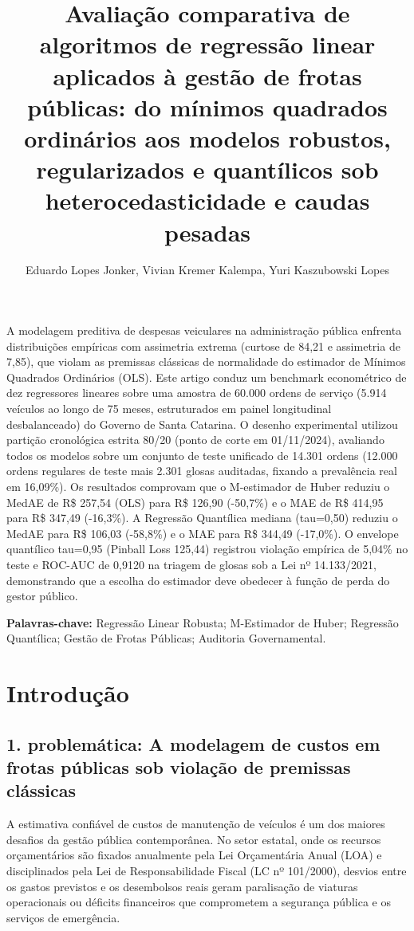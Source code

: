 \documentclass[12pt,a4paper]{article}
\title{\textbf{Avaliação comparativa de algoritmos de regressão linear aplicados à gestão de frotas públicas: do mínimos quadrados ordinários aos modelos robustos, regularizados e quantílicos sob heterocedasticidade e caudas pesadas}}
\author{Eduardo Lopes Jonker\inst{1}, Vivian Kremer Kalempa\inst{1}, Yuri Kaszubowski Lopes\inst{1}}
\begin{document}
\maketitle

\begin{resumo}
A modelagem preditiva de despesas veiculares na administração pública enfrenta distribuições empíricas com assimetria extrema (curtose de 84,21 e assimetria de 7,85), que violam as premissas clássicas de normalidade do estimador de Mínimos Quadrados Ordinários (OLS). Este artigo conduz um benchmark econométrico de dez regressores lineares sobre uma amostra de 60.000 ordens de serviço (5.914 veículos ao longo de 75 meses, estruturados em painel longitudinal desbalanceado) do Governo de Santa Catarina. O desenho experimental utilizou partição cronológica estrita 80/20 (ponto de corte em 01/11/2024), avaliando todos os modelos sobre um conjunto de teste unificado de 14.301 ordens (12.000 ordens regulares de teste mais 2.301 glosas auditadas, fixando a prevalência real em 16,09\%). Os resultados comprovam que o M-estimador de Huber reduziu o MedAE de R\$ 257,54 (OLS) para R\$ 126,90 (-50,7\%) e o MAE de R\$ 414,95 para R\$ 347,49 (-16,3\%). A Regressão Quantílica mediana (tau=0,50) reduziu o MedAE para R\$ 106,03 (-58,8\%) e o MAE para R\$ 344,49 (-17,0\%). O envelope quantílico tau=0,95 (Pinball Loss 125,44) registrou violação empírica de 5,04\% no teste e ROC-AUC de 0,9120 na triagem de glosas sob a Lei nº 14.133/2021, demonstrando que a escolha do estimador deve obedecer à função de perda do gestor público.

\vspace{0.2cm}
\noindent\textbf{Palavras-chave:} Regressão Linear Robusta; M-Estimador de Huber; Regressão Quantílica; Gestão de Frotas Públicas; Auditoria Governamental.
\end{resumo}



\section{Introdução}


\subsection{1. problemática: A modelagem de custos em frotas públicas sob violação de premissas clássicas}

A estimativa confiável de custos de manutenção de veículos é um dos maiores desafios da gestão pública contemporânea. No setor estatal, onde os recursos orçamentários são fixados anualmente pela Lei Orçamentária Anual (LOA) e disciplinados pela Lei de Responsabilidade Fiscal (LC nº 101/2000), desvios entre os gastos previstos e os desembolsos reais geram paralisação de viaturas operacionais ou déficits financeiros que comprometem a segurança pública e os serviços de emergência.
\end{document}
